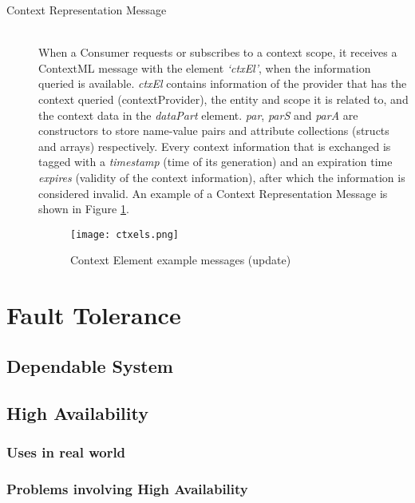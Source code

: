 \begin{description}
\item[Context Representation Message]\hfill \\
When a Consumer requests or subscribes to a context scope, it receives a ContextML message with the element \textit{‘ctxEl’}, when the information queried is available. \textit{ctxEl} contains information of the provider that has the context queried (contextProvider), the entity and scope it is related to, and the context data in the \textit{dataPart} element. \textit{par}, \textit{parS} and \textit{parA} are constructors to store name-value pairs and attribute collections (structs and arrays) respectively. Every context information that is exchanged is tagged with a \textit{timestamp} (time of its generation) and an expiration time \textit{expires} (validity of the context information), after which the information is considered invalid. An example of a Context Representation Message is shown in Figure \ref{fig:ctxels}.

\begin{figure}[h]
	\centering
	\texttt{[image: ctxels.png]}
	\caption{Context Element example messages (update)}
	\label{fig:ctxels}
	
\end{figure}


\end{description}


\section{Fault Tolerance}
\label{sec:fault_tolerance}
\cite{arsanjani2004service} \cite{avivzienis2004basic}   \cite{barreradesign}  \cite{skeen1981nonblocking} 
\subsection{Dependable System}
\subsection{High Availability}
\subsubsection{Uses in real world}
\subsubsection{Problems involving High Availability}

